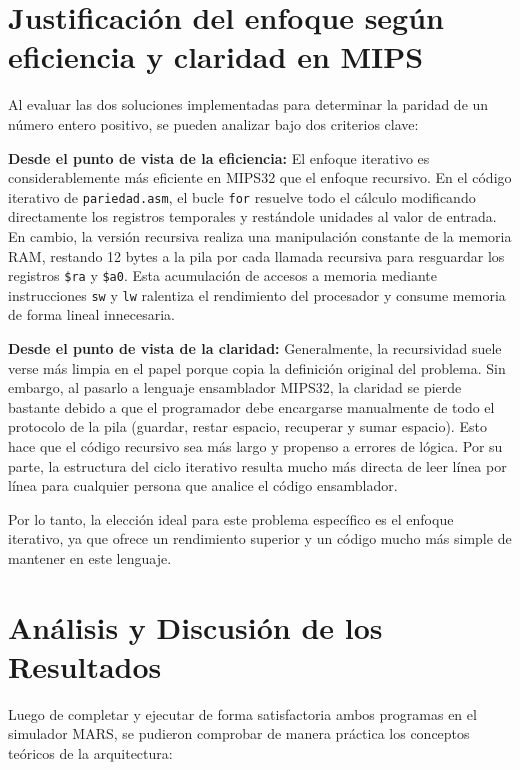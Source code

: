 \documentclass[12pt, a4paper]{article}
\begin{document}
\section{Justificación del enfoque según eficiencia y claridad en MIPS}

Al evaluar las dos soluciones implementadas para determinar la paridad de un número entero positivo, se pueden analizar bajo dos criterios clave:

{\large\textbf{Desde el punto de vista de la eficiencia:}} El enfoque iterativo es considerablemente más eficiente en MIPS32 que el enfoque recursivo. En el código iterativo de \lstinline|pariedad.asm|, el bucle \lstinline|for| resuelve todo el cálculo modificando directamente los registros temporales y restándole unidades al valor de entrada. En cambio, la versión recursiva realiza una manipulación constante de la memoria RAM, restando 12 bytes a la pila por cada llamada recursiva para resguardar los registros \lstinline|$ra| y \lstinline|$a0|. Esta acumulación de accesos a memoria mediante instrucciones \lstinline|sw| y \lstinline|lw| ralentiza el rendimiento del procesador y consume memoria de forma lineal innecesaria.

{\large\textbf{Desde el punto de vista de la claridad:}} Generalmente, la recursividad suele verse más limpia en el papel porque copia la definición original del problema. Sin embargo, al pasarlo a lenguaje ensamblador MIPS32, la claridad se pierde bastante debido a que el programador debe encargarse manualmente de todo el protocolo de la pila (guardar, restar espacio, recuperar y sumar espacio). Esto hace que el código recursivo sea más largo y propenso a errores de lógica. Por su parte, la estructura del ciclo iterativo resulta mucho más directa de leer línea por línea para cualquier persona que analice el código ensamblador.

Por lo tanto, la elección ideal para este problema específico es el enfoque iterativo, ya que ofrece un rendimiento superior y un código mucho más simple de mantener en este lenguaje.

\newpage

\section{Análisis y Discusión de los Resultados}

Luego de completar y ejecutar de forma satisfactoria ambos programas en el simulador MARS, se pudieron comprobar de manera práctica los conceptos teóricos de la arquitectura:
\end{document}
